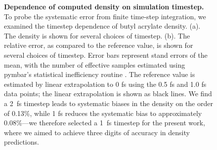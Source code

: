 \documentclass[aps,pre,twocolumn,nofootinbib,superscriptaddress,linenumbers]{revtex4-1}
\begin{document}
\begin{figure}


\caption{
{\bf Dependence of computed density on simulation timestep.}
To probe the systematic error from finite time-step integration, we examined the timestep dependence of butyl acrylate density.  
(a).  The density is shown for several choices of timestep.  
(b).  The relative error, as compared to the reference value, is shown for several choices of timestep.  
Error bars represent stand errors of the mean, with the number of effective samples estimated using pymbar's statistical inefficiency routine \cite{shirts2008statistically}.  
The reference value is estimated by linear extrapolation to 0 fs using the 0.5 fs and 1.0 fs data points; the linear extrapolation is shown as black lines.  
We find a 2~fs timestep leads to systematic biases in the density on the order of 0.13\%, while 1 fs reduces the systematic bias to approximately 0.08\%---we therefore selected a 1~fs timestep for the present work, where we aimed to achieve three digits of accuracy in density predictions.
}
\label{figure:timestep}

\end{figure}
\end{document}
